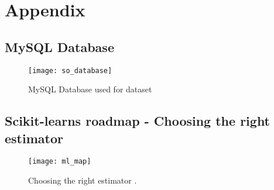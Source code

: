 \appendix

\chapter{Appendix}
\label{app:acronyms}
\printindex
\printglossaries


\clearpage
\section{MySQL Database}
\label{app:mysql_database}
\begin{figure}[ht]
	\centering
    \texttt{[image: so\_database]}
	\caption{MySQL Database used for dataset}
	\label{fig:mysql_database}
\end{figure}

\clearpage
\section{Scikit-learns roadmap - Choosing the right estimator}
\label{app:ml_map}
\begin{figure}[ht]
	\centering
	\texttt{[image: ml\_map]}
	\caption[Choosing the right estimator]{Choosing the right estimator \cite{Scikitlearn.org2016i}.}
	\label{fig:ml_map}
\end{figure}

\clearpage

